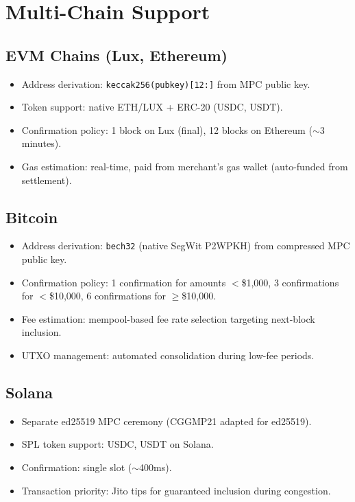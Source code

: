 \section{Multi-Chain Support}

\label{sec:multichain}

\subsection{EVM Chains (Lux, Ethereum)}

\begin{itemize}[leftmargin=1.4em]
    \item Address derivation: \texttt{keccak256(pubkey)[12:]} from MPC
    public key.
    \item Token support: native ETH/LUX + ERC-20 (USDC, USDT).
    \item Confirmation policy: 1 block on Lux (final), 12 blocks on
    Ethereum ($\sim$3 minutes).
    \item Gas estimation: real-time, paid from merchant's gas wallet
    (auto-funded from settlement).
\end{itemize}

\subsection{Bitcoin}

\begin{itemize}[leftmargin=1.4em]
    \item Address derivation: \texttt{bech32} (native SegWit P2WPKH) from
    compressed MPC public key.
    \item Confirmation policy: 1 confirmation for amounts $<$\$1,000, 3
    confirmations for $<$\$10,000, 6 confirmations for $\geq$\$10,000.
    \item Fee estimation: mempool-based fee rate selection targeting next-block
    inclusion.
    \item UTXO management: automated consolidation during low-fee periods.
\end{itemize}

\subsection{Solana}

\begin{itemize}[leftmargin=1.4em]
    \item Separate ed25519 MPC ceremony (CGGMP21 adapted for ed25519).
    \item SPL token support: USDC, USDT on Solana.
    \item Confirmation: single slot ($\sim$400ms).
    \item Transaction priority: Jito tips for guaranteed inclusion during
    congestion.
\end{itemize}

